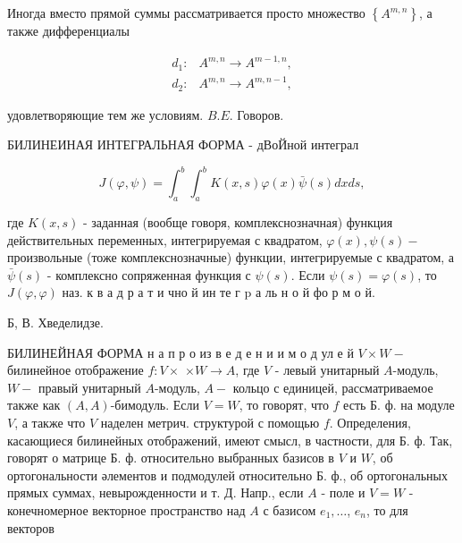 \documentclass[10pt]{article}
\begin{document}
Иногда вместо прямой суммы рассматривается просто множество $\left\{A^{m, n}\right\}$, а также дифференциалы



\[

\begin{array}{ll}

d_{1}: & A^{m, n} \longrightarrow A^{m-1, n}, \\

d_{2}: & A^{m, n} \longrightarrow A^{m, n-1},

\end{array}

\]



удовлетворяющие тем же условиям. $B . E$. Говоров.



БИЛИНЕИНАЯ ИНТЕГРАЛЬНАЯ ФОРМА - дВоЙной интеграл



\[

J(\varphi, \psi)=\int_{a}^{b} \int_{a}^{b} K(x, s) \varphi(x) \bar{\psi}(s) d x d s,

\]



где $K(x, s)$ - заданная (вообще говоря, комплекснозначная) функция действительных переменных, интегрируемая с квадратом, $\varphi(x), \psi(s)-$ произвольные (тоже комплекснозначные) функции, интегрируемые с квадратом, а $\bar{\psi}(s)$ - комплексно сопряженная функция с $\psi(s)$. Если $\psi(s)=\varphi(s)$, то $J(\varphi, \varphi)$ наз. к в а д р а т и чно й ин те г p а ль н о й фо р м о й.



Б, В. Хведелидзе.



БИЛИНЕЙНАЯ ФОРМА н а п р о из в е д е н и и м о д ул е й $V \times W-$ билинейное отображение $f: V \times$ $\times W \rightarrow A$, где $V$ - левый унитарный $A$-модуль, $W-$ правый унитарный $A$-модуль, $A-$ кольцо с единицей, рассматриваемое также как $(A, A)$-бимодуль. Если $V=W$, то говорят, что $f$ есть Б. ф. на модуле $V$, а также что $V$ наделен метрич. структурой с помощью $f$. Определения, касающиеся билинейных отображений, имеют смысл, в частности, для Б. ф. Так, говорят о матрице Б. ф. относительно выбранных базисов в $V$ и $W$, об ортогональности әлементов и подмодулей относительно Б. ф., об ортогональных прямых суммах, невырожденности и т. Д. Напр., если $A$ - поле и $V=W$ - конечномерное векторное пространство над $A$ с базисом $e_{1}, \ldots$, $e_{n}$, то для векторов
\end{document}

